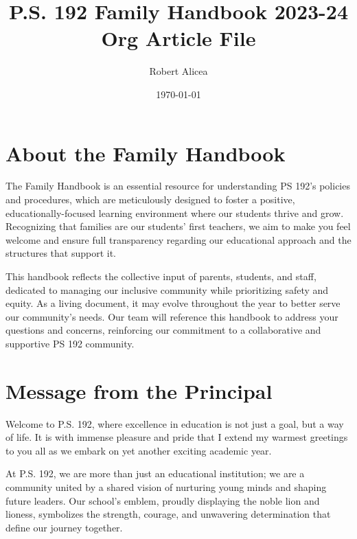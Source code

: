 \documentclass[letterpaper, 11pt]{article}
\author{Robert Alicea}
\date{\today}
\title{P.S. 192 Family Handbook 2023-24 Org Article File}
\begin{document}


\pagenumbering{\fancyhf{}}
\pagestyle{headings}

\fancyhead[R]{\thepage}

\pagestyle{fancy}
\renewcommand{\footrulewidth}{1px}


\clearpage
\clearpage \tableofcontents \clearpage


\section{About the Family Handbook}
\label{sec:org65cd837}
The Family Handbook is an essential resource for understanding PS 192's policies and procedures, which are meticulously designed to foster a positive, educationally-focused learning environment where our students thrive and grow. Recognizing that families are our students' first teachers, we aim to make you feel welcome and ensure full transparency regarding our educational approach and the structures that support it.

This handbook reflects the collective input of parents, students, and staff, dedicated to managing our inclusive community while prioritizing safety and equity. As a living document, it may evolve throughout the year to better serve our community's needs. Our team will reference this handbook to address your questions and concerns, reinforcing our commitment to a collaborative and supportive PS 192 community.

\clearpage

\section{Message from the Principal}
\label{sec:orgd837d56}

Welcome to P.S. 192, where excellence in education is not just a goal, but a way of life. It is with immense pleasure and pride that I extend my warmest greetings to you all as we embark on yet another exciting academic year.

At P.S. 192, we are more than just an educational institution; we are a community united by a shared vision of nurturing young minds and shaping future leaders. Our school’s emblem, proudly displaying the noble lion and lioness, symbolizes the strength, courage, and unwavering determination that define our journey together.
\end{document}
